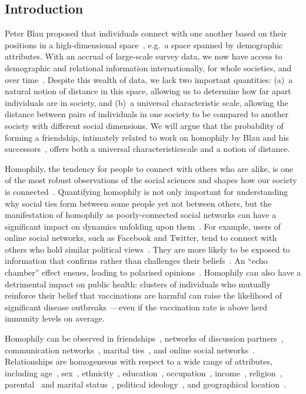 \documentclass{scrartcl}
\begin{document}
\begin{refsection}
\section{Introduction\label{sec:introduction}}

Peter Blau proposed that individuals connect with one another based on their positions in a high-dimensional space~\cite{Blau1977}, e.g.\ a space spanned by demographic attributes. With an accrual of large-scale survey data, we now have access to demographic and relational information internationally, for whole societies, and over time~\cite{McPherson2001,McPherson2006,Mossong2008}. Despite this wealth of data, we lack two important quantities: (a)~a natural notion of distance in this space, allowing us to determine how far apart individuals are in society, and (b)~a universal characteristic scale, allowing the distance between pairs of individuals in one society to be compared to another society with different social dimensions. We will argue that the probability of forming a friendship, intimately related to work on homophily by Blau and his successors~\cite{McPherson2001}, offers both a universal characteristicscale and a notion of distance.

Homophily, the tendency for people to connect with others who are alike, is one of the most robust observations of the social sciences and shapes how our society is connected~\cite{McPherson2001}. Quantifying homophily is not only important for understanding why social ties form between some people yet not between others, but the manifestation of homophily as poorly-connected social networks can have a significant impact on dynamics unfolding upon them~\cite{Golub2012}. For example, users of online social networks, such as Facebook and Twitter, tend to connect with others who hold similar political views~\cite{Boutyline2017}. They are more likely to be exposed to information that confirms rather than challenges their beliefs~\cite{Bakshy2015}. An ``echo chamber'' effect ensues, leading to polarised opinions~\cite{DeMarzo2003}. Homophily can also have a detrimental impact on public health: clusters of individuals who mutually reinforce their belief that vaccinations are harmful can raise the likelihood of significant disease outbreaks~\cite{Salathe2008}---even if the vaccination rate is above herd immunity levels on average.

Homophily can be observed in friendships~\cite{Currarini2009, Hipp2009}, networks of discussion partners~\cite{McPherson2006}, communication networks~\cite{Wang2013, Leo2016}, marital ties~\cite{Blau1984}, and online social networks~\cite{Chang2010}. Relationships are homogeneous with respect to a wide range of attributes, including age~\cite{Marsden1988,Smith2014}, sex~\cite{Smith2014}, ethnicity~\cite{Chang2010, Blumenstock2013, Currarini2009}, education~\cite{McPherson2006, Smith2014,Johnson1989}, occupation~\cite{Chan2004}, income~\cite{Leo2016, Wang2013, Johnson1989}, religion~\cite{Platt2012}, parental~\cite{Johnson1989} and marital status~\cite{Kalmijn2007}, political ideology~\cite{Bakshy2015, Boutyline2017}, and geographical location~\cite{Lambiotte2008, Expert2011, Backstrom2010, Scellato2011, Illenberger2013}.


\end{refsection}
\end{document}
